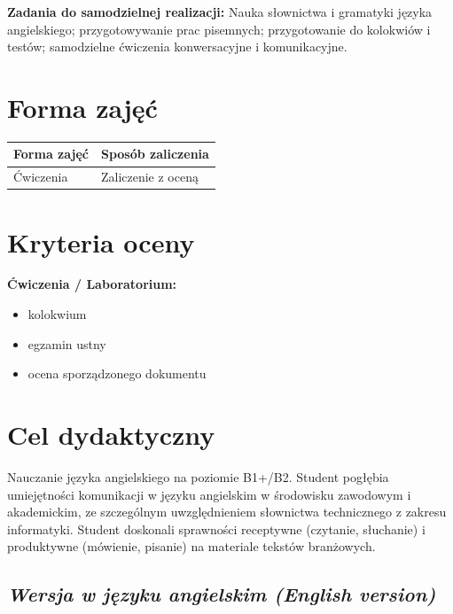 \documentclass[12pt, a4paper]{article}
\newcommand{\thdrule}{\noalign{\global\setlength{\extrarowheight}{0pt}}}
\newcommand{\thdend}{\noalign{\global\setlength{\extrarowheight}{3pt}}}
\begin{document}
\vspace{4pt}
\noindent\textbf{Zadania do samodzielnej realizacji:} Nauka słownictwa i gramatyki języka angielskiego; przygotowywanie prac pisemnych; przygotowanie do kolokwiów i testów; samodzielne ćwiczenia konwersacyjne i komunikacyjne.

\section{Forma zajęć}

\begin{center}
{\scriptsize
\begin{tabular}{m{5cm}m{8cm}}
\thdrule\toprule
\rowcolor{pjatkRed} {\color{white}\textbf{Forma zajęć}} & {\color{white}\textbf{Sposób zaliczenia}} \\
\midrule\thdend
  \rowcolor{tableRowLight} Ćwiczenia & Zaliczenie z oceną \\
\bottomrule
\end{tabular}}
\end{center}

\section{Kryteria oceny}

\textbf{Ćwiczenia / Laboratorium:}
\begin{itemize}
  \item kolokwium
  \item egzamin ustny
  \item ocena sporządzonego dokumentu
\end{itemize}


\section{Cel dydaktyczny}

Nauczanie języka angielskiego na poziomie B1+/B2. Student pogłębia umiejętności komunikacji w języku angielskim w środowisku zawodowym i akademickim, ze szczególnym uwzględnieniem słownictwa technicznego z zakresu informatyki. Student doskonali sprawności receptywne (czytanie, słuchanie) i produktywne (mówienie, pisanie) na materiale tekstów branżowych.

\subsection*{\textit{Wersja w języku angielskim (English version)}}
\end{document}
